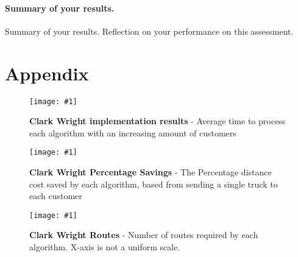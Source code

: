\documentclass[conference]{acmsiggraph}
\newcommand{\figuremacroF}[4]{
	\begin{figure*}[t] %
		\centering
		\texttt{[image: \#1]}
		\caption[#2]{\textbf{#2} - #3}
		\label{fig:#1}
	\end{figure*}
}
\begin{document}
\paragraph{Summary of your results.}
Summary of your results.
Reflection on your performance on this assessment. 

\section{Appendix}




\afterpage{\clearpage}

\figuremacroF
{chart1}
{Clark Wright implementation results}
{Average time to process each algorithm with an increasing amount of customers}
{1.0}

\figuremacroF
{chart2}
{Clark Wright Percentage Savings}
{The Percentage distance cost saved by each algorithm, based from sending a single truck to each customer}
{1.0}

\figuremacroF
{chart3}
{Clark Wright Routes}
{Number of routes required by each algorithm. X-axis is not a uniform scale.}
{1.0}
\end{document}
